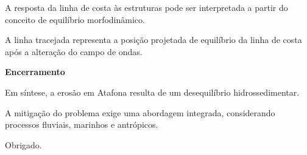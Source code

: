 \documentclass[12pt]{article}
\begin{document}
A resposta da linha de costa às estruturas pode ser interpretada a partir do conceito de equilíbrio morfodinâmico.

A linha tracejada representa a posição projetada de equilíbrio da linha de costa após a alteração do campo de ondas.

\vspace{0.5em}

\textbf{Encerramento}

Em síntese, a erosão em Atafona resulta de um desequilíbrio hidrossedimentar.

A mitigação do problema exige uma abordagem integrada, considerando processos fluviais, marinhos e antrópicos.

Obrigado.
\end{document}
